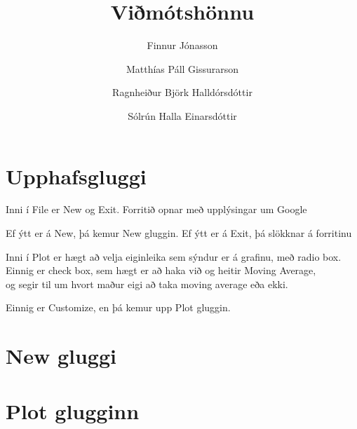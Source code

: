 \documentclass[a4]{article}
\begin{document}
\pagestyle{empty} %

\title{Viðmótshönnu} \author{Finnur Jónasson \and Matthías Páll
  Gissurarson \and Ragnheiður Björk Halldórsdóttir \and Sólrún Halla
  Einarsdóttir}

\section{Upphafsgluggi}

\noindent
Inni í File er New og Exit.  Forritið opnar með upplýsingar um Google

\noindent
Ef ýtt er á New, þá kemur New gluggin.  Ef ýtt er á Exit, þá slökknar
á forritinu

\noindent
Inni í Plot er hægt að velja eiginleika sem sýndur er á grafinu, með
radio box.\\  Einnig er check box, sem hægt er að haka við og heitir
Moving Average,\\ og segir til um hvort maður eigi að taka moving
average eða ekki.

\noindent
Einnig er Customize, en þá kemur upp Plot gluggin.

\section{New gluggi}



\section{Plot glugginn}

\end{document}
